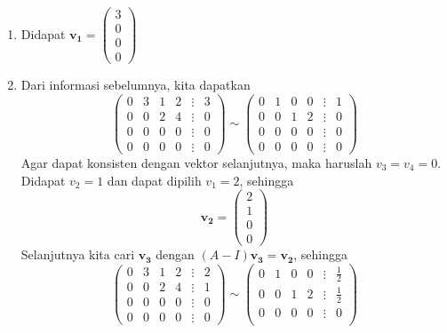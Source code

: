 \documentclass[a4paper]{article}
\theoremstyle{definisi}
\numberwithin{equation}{section}
\begin{document}
\begin{enumerate}
\begin{enumerate}[label=Langkah \arabic*: ,leftmargin=*]
      \item Didapat $\mathbf{v_1}=\begin{pmatrix}
        3\\0\\0\\0
      \end{pmatrix}$
      \item Dari informasi sebelumnya, kita dapatkan
      \begin{equation*}
        \begin{pmatrix}
          0&3&1&2&\vdots&3\\
          0&0&2&4&\vdots&0\\
          0&0&0&0&\vdots&0\\
          0&0&0&0&\vdots&0
        \end{pmatrix}\sim
        \begin{pmatrix}
          0&1&0&0&\vdots&1\\
          0&0&1&2&\vdots&0\\
          0&0&0&0&\vdots&0\\
          0&0&0&0&\vdots&0
        \end{pmatrix}
      \end{equation*}
      Agar dapat konsisten dengan vektor selanjutnya, maka haruslah $v_3=v_4=0$. Didapat $v_2=1$ dan dapat dipilih $v_1=2$, sehingga
      \begin{equation*}
        \mathbf{v_2}=\begin{pmatrix}
          2\\1\\0\\0
        \end{pmatrix}
      \end{equation*}
      Selanjutnya kita cari $\mathbf{v_3}$ dengan $(A-I)\mathbf{v_3}=\mathbf{v_2}$, sehingga
      \begin{equation*}
        \begin{pmatrix}
          0&3&1&2&\vdots&2\\
          0&0&2&4&\vdots&1\\
          0&0&0&0&\vdots&0\\
          0&0&0&0&\vdots&0
        \end{pmatrix}\sim
        \begin{pmatrix}
          0&1&0&0&\vdots&\frac{1}{2}\\
          0&0&1&2&\vdots&\frac{1}{2}\\
          0&0&0&0&\vdots&0\\

\end{pmatrix}
\end{equation*}
\end{enumerate}
\end{enumerate}
\end{document}
